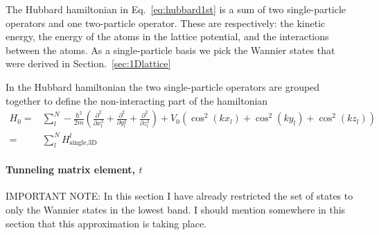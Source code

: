 \documentclass[oneside,11pt]{memoir}
\newcommand{\vo}{\ensuremath{V_{0}}}
\begin{document}
The Hubbard hamiltonian in Eq.~\ref{eq:hubbard1st} is a sum of two
single-particle operators and one two-particle operator.  These are
respectively: the kinetic energy, the energy of the atoms in the lattice
potential, and the interactions between the atoms.  As a single-particle basis
we pick the Wannier states that were derived in Section.~\ref{sec:1Dlattice}

In the Hubbard hamiltonian the two single-particle operators are grouped
together to define the non-interacting part of the hamiltonian 
\begin{equation}
\begin{split}
  H_{0} = & \sum_{l}^{N} -\frac{\hbar^{2}}{2m} \left( \frac{\partial^{2}}{\partial x_{l}^{2}}
                            + \frac{\partial^{2}}{\partial y_{l}^{2}}
                            + \frac{\partial^{2}}{\partial z_{l}^{2}} \right)
 + \vo\left( \cos^{2}(kx_{l})  + \cos^{2}(ky_{l}) + \cos^{2}(kz_{l}) \right) \\
       = & \sum_{l}^{N} H_{\text{single,3D}}^{l}
\end{split}
\end{equation}

\paragraph{Tunneling matrix element, $t$}

IMPORTANT NOTE: In this section I have already restricted the set of states to
only the Wannier states in the lowest band.  I should mention somewhere in this
section that this approximation is taking place. 
\end{document}
